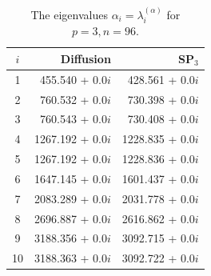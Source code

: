 \documentclass[authoryear]{elsarticle}
\begin{document}
\begin{table}[htp]
\caption{The eigenvalues $\alpha_i=\lambda_i^{(\alpha)}$ for $p=3, n=96$.}
\label{tab:iaea_without_alpha_10}
\begin{center}
\begin{tabular}{c r r}
\hline
$i$ & Diffusion & SP$_3$ \\
\hline
1 & 455.540 + 0.0$i$& 428.561 + 0.0$i$ \\
2 & 760.532 + 0.0$i$& 730.398 + 0.0$i$ \\
3 & 760.543 + 0.0$i$& 730.408 + 0.0$i$ \\
4 & 1267.192 + 0.0$i$&1228.835 + 0.0$i$ \\
5 & 1267.192 + 0.0$i$&1228.836 + 0.0$i$ \\
6 & 1647.145 + 0.0$i$&1601.437 + 0.0$i$ \\
7 & 2083.289 + 0.0$i$&2031.778 + 0.0$i$ \\
8 & 2696.887 + 0.0$i$&2616.862 + 0.0$i$ \\
9 & 3188.356 + 0.0$i$&3092.715 + 0.0$i$ \\
10& 3188.363 + 0.0$i$&3092.722 + 0.0$i$ \\
\hline
\end{tabular}
\end{center}
\end{table}
\end{document}
